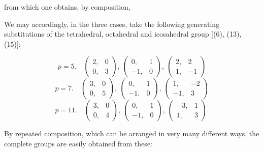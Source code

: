 
from which one obtains, by composition,


We may accordingly, in the three cases, take the following generating substitutions of the tetrahedral, octahedral and icosahedral group [(6), (13), (15)]:

\[
p = 5. \quad \begin{pmatrix} 2, & 0 \\ 0, & 3 \end{pmatrix}, \ \begin{pmatrix} 0, & 1 \\ -1, & 0 \end{pmatrix}, \ \begin{pmatrix} 2, & 2 \\ 1, & -1 \end{pmatrix}
\]
\[
p = 7. \quad \begin{pmatrix} 3, & 0 \\ 0, & 5 \end{pmatrix}, \ \begin{pmatrix} 0, & 1 \\ -1, & 0 \end{pmatrix}, \ \begin{pmatrix} 1, & -2 \\ -1, & 3 \end{pmatrix}
\]
\[
p = 11. \quad \begin{pmatrix} 3, & 0 \\ 0, & 4 \end{pmatrix}, \ \begin{pmatrix} 0, & 1 \\ -1, & 0 \end{pmatrix}, \ \begin{pmatrix} -3, & 1 \\ 1, & 3 \end{pmatrix}.
\]

By repeated composition, which can be arranged in very many different ways, the complete groups are easily obtained from these:

